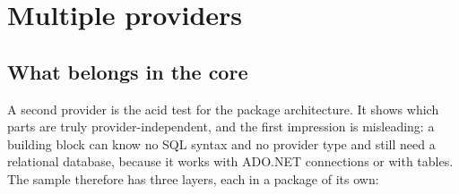 \part{Multiple providers}\label{part:providers}

\chapter{What belongs in the core}\label{ch:what-belongs-in-the-core}

A second provider is the acid test for the package architecture. It shows which parts are
truly provider-independent, and the first impression is misleading: a building block can know
no SQL syntax and no provider type and still need a relational database, because it works
with ADO.NET connections or with tables. The sample therefore has three layers, each in a
package of its own:

